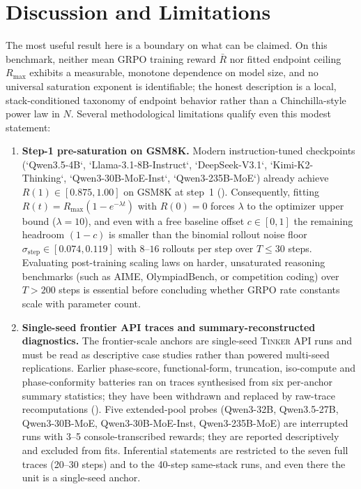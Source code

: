 \section{Discussion and Limitations}
\label{sec:p1-discussion}
The most useful result here is a boundary on what can be claimed. On this
benchmark, neither mean GRPO training reward $\bar{R}$ nor fitted endpoint ceiling $R_{\max}$ exhibits a measurable, monotone dependence
on model size, and no universal saturation exponent is identifiable; the honest
description is a local, stack-conditioned taxonomy of endpoint behavior rather than a
Chinchilla-style power law in $N$. Several methodological limitations qualify even this modest
statement:
\begin{enumerate}[leftmargin=*,nosep]
  \item \textbf{Step-1 pre-saturation on GSM8K.} Modern instruction-tuned checkpoints (`Qwen3.5-4B`, `Llama-3.1-8B-Instruct`, `DeepSeek-V3.1`, `Kimi-K2-Thinking`, `Qwen3-30B-MoE-Inst`, `Qwen3-235B-MoE`) already achieve $R(1) \in [0.875, 1.00]$ on GSM8K at step~1 (). Consequently, fitting $R(t) = R_{\max}(1 - e^{-\lambda t})$ with $R(0)=0$ forces $\lambda$ to the optimizer upper bound ($\lambda = 10$), and even with a free baseline offset $c \in [0,1]$ the remaining headroom $(1 - c)$ is smaller than the binomial rollout noise floor $\sigma_{\text{step}} \in [0.074, 0.119]$ with $8$--$16$ rollouts per step over $T \le 30$ steps. Evaluating post-training scaling laws on harder, unsaturated reasoning benchmarks (such as AIME, OlympiadBench, or competition coding) over $T > 200$ steps is essential before concluding whether GRPO rate constants scale with parameter count.
  \item \textbf{Single-seed frontier API traces and summary-reconstructed diagnostics.} The frontier-scale anchors are single-seed \textsc{Tinker} API runs and must be read as descriptive case studies rather than powered multi-seed replications. Earlier phase-score, functional-form, truncation, iso-compute and phase-conformity batteries ran on traces synthesised from six per-anchor summary statistics; they have been withdrawn and replaced by raw-trace recomputations ().  Five extended-pool probes (Qwen3-32B, Qwen3.5-27B, Qwen3-30B-MoE, Qwen3-30B-MoE-Inst, Qwen3-235B-MoE) are interrupted runs with 3--5 console-transcribed rewards; they are reported descriptively and excluded from fits.  Inferential statements are restricted to the seven full traces (20--30 steps) and to the 40-step same-stack runs, and even there the unit is a single-seed anchor.

\end{enumerate}
